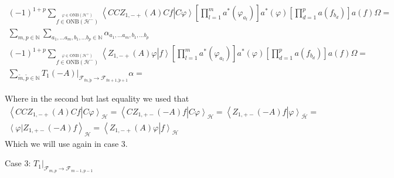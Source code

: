 \documentclass[a4paper,12pt]{article}
\begin{document}
\begin{multline}
(-1)^{1 + p}\sum_{\stackrel{\varphi \in \text{ONB}(\mathcal{H}^+)}{f\in \text{ONB}(\mathcal{H}^-)}}\left<C C Z_{1,-+}(A)C f \right|\left. C  \varphi \right>
\left[\prod_{l=1}^m a^*( \varphi_{a_l}) \right]
 a^*(\varphi)  \left[\prod_{d=1}^p a( f_{b_d})\right] a(f)\Omega =\\
    \sum_{m,p \in \mathbb{N}} \sum_{a_1, \dots a_m, b_1, \dots b_p \in \mathbb{N}} \alpha_{a_1, \dots a_m, b_1, \dots b_p}  \\
(-1)^{1 + p}\sum_{\stackrel{\varphi \in \text{ONB}(\mathcal{H}^+)}{f\in \text{ONB}(\mathcal{H}^-)}}\left<  Z_{1,-+}(A)\varphi \right|\left.   f \right>
\left[\prod_{l=1}^m a^*( \varphi_{a_l}) \right]
 a^*(\varphi)  \left[\prod_{d=1}^p a( f_{b_d})\right] a(f)\Omega=\\
 \sum_{\tilde{m},\tilde{p}\in \mathbb{N}}\left. T_1(-A)\right|_{\mathcal{F}_{\tilde{m},\tilde{p}}\rightarrow\mathcal{F}_{\tilde{m}+1,\tilde{p}+1}}  \alpha=
\end{multline}

Where in the second but last equality we used that 
\begin{multline}
\left<C C Z_{1,-+}(A)C f \right|\left. C  \varphi \right>_\mathcal{H}=
\left<C  Z_{1,+-}(-A) f \right|\left. C  \varphi \right>_\mathcal{H}=
\left<  Z_{1,+-}(-A) f \right|\left.   \varphi \right>_{\bar{\mathcal{H}}}=\\
\left< \varphi   \right|\left. Z_{1,+-}(-A) f  \right>_{\mathcal{H}}=
\left< Z_{1,-+}(A)  \varphi   \right|\left. f  \right>_{\mathcal{H}}
\end{multline}
Which we will use again in case 3.

\begin{center}
{\large Case 3: \(\left. T_1\right|_{\mathcal{F}_{m,p}\rightarrow\mathcal{F}_{m-1,p-1}}\)}
\end{center}
\end{document}
